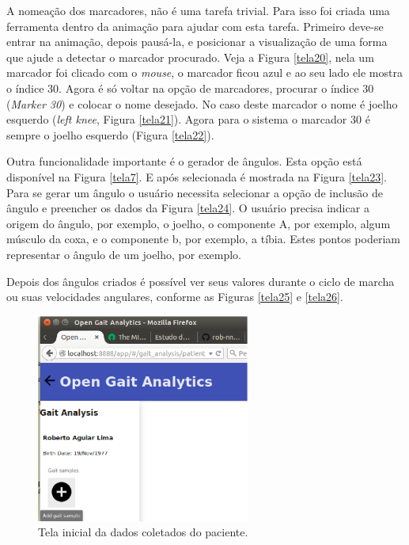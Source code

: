 A nomeação dos marcadores, não é uma tarefa trivial. Para isso foi criada uma ferramenta dentro da animação para ajudar com esta tarefa. Primeiro deve-se entrar na animação, depois pausá-la, e posicionar a visualização de uma forma que ajude a detectar o marcador procurado. Veja a Figura \ref{tela20}, nela um marcador foi clicado com o \emph{mouse}, o marcador ficou azul e ao seu lado ele mostra o índice 30. 
Agora é só voltar na opção de marcadores, procurar o índice 30 (\emph{Marker 30}) e colocar o nome desejado. No caso deste marcador o nome é joelho esquerdo (\emph{left knee}, Figura \ref{tela21}).
Agora para o sistema o marcador 30 é sempre o joelho esquerdo (Figura \ref{tela22}).

Outra funcionalidade importante é o gerador de ângulos. Esta opção está disponível na Figura \ref{tela7}. E após selecionada é mostrada na Figura \ref{tela23}. 
Para se gerar um ângulo o usuário necessita selecionar a opção de inclusão de ângulo e preencher os dados da Figura \ref{tela24}. O usuário precisa indicar a origem do ângulo, por exemplo, o joelho, o componente A, por exemplo, algum músculo da coxa, e o componente b, por exemplo, a tíbia. Estes pontos poderiam representar o ângulo de um joelho, por exemplo.

Depois dos ângulos criados é possível ver seus valores durante o ciclo de marcha ou suas velocidades angulares, conforme as Figuras \ref{tela25} e \ref{tela26}.

\begin{figure}[ht]
	\centering
	\includegraphics[width=7cm]{figuras/tela4.eps}
	\caption{Tela inicial da dados coletados do paciente.}
	\label{tela4}
\end{figure}



